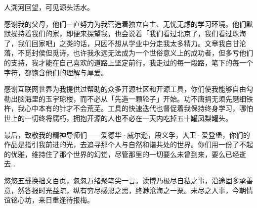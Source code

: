 \begin{ack}
    人溯河回望，可见源头活水。
    
    感谢我的父母，他们一直努力为我营造着独立自主、无忧无虑的学习环境。他们默默操持着我们的家，即便来探望我，也会说着「我们看过北京了，我们看过珠海了，我们回家吧」之类的话，只因不想从学业中分走我太多精力。文章我自甘沦落，不觅封侯但觅诗，也许我永远无法成为一个世俗意义上的成功者，但多亏他们的支持，我才能在自己喜欢的道路上坚定前行，我走过的每一段路，笔下的每一个字符，都饱含他们的理解与厚爱。
    
    感谢互联网世界为我提供过帮助的众多开源社区和开源工具，你们使我能够自由勾勒出脑海里的玉宇琼楼，而不必从「先造一颗轮子」开始。功不唐捐无须先磨细铁杵，我心中本有的针才不会荒芜。工具的快速迭代也督促着我保持终身学习，哪怕世上的一切终将腐朽，拥抱开源的人也不必在一天内吃掉五十罐凤梨罐头。
    
    最后，致敬我的精神导师们——爱德华·威尔逊，段义孚，大卫·爱登堡，你们的作品是指引我前进的光，去追寻那个人与自然和谐共处的世界。你们用一份了不起的优雅，维持住了那个世界的幻觉，尽管那里的一切要么未曾到来，要么已经逝去\ldots
    
    悠悠五载换拙文百页，忽忽万绪聚笔尖一言。读博乃极尽自私之事，沿途固多承善意，然答报时光益疏，纵有穷尽感恩之思，终渺沧海之一粟。未尽之人事，今朝情谊铭心坊，来日重逢待报梅。
\end{ack}
